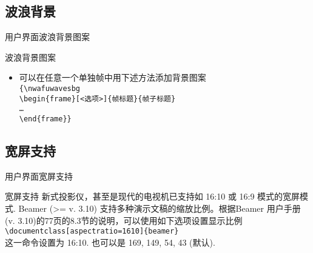 \subsection{波浪背景}
\begin{frame}{用户界面}{波浪背景图案}
  \begin{block}{波浪背景图案}
    \begin{itemize}
    \item 可以在任意一个单独帧中用下述方法添加背景图案\\
      {\tt \{\textbackslash nwafuwavesbg\\
        \textbackslash begin\{frame\}[<选项>]\{帧标题\}\{帧子标题\}\\
        \ldots\\
        \textbackslash end\{frame\}\}}
    \end{itemize}
  \end{block}
\end{frame}

\subsection{宽屏支持}
\begin{frame}{用户界面}{宽屏支持}
  \begin{block}{宽屏支持}
    新式投影仪，甚至是现代的电视机已支持如 16:10 或 16:9 模式的宽屏模式.
    Beamer (>= v. 3.10) 支持多种演示文稿的缩放比例。根据Beamer 用户手册
    (v. 3.10)的77页的8.3节的说明，可以使用如下选项设置显示比例\\
    {\tt\textbackslash documentclass[aspectratio=1610]\{beamer\}}\\
    这一命令设置为 16:10. 也可以是 169, 149, 54, 43 (默认).
  \end{block}
\end{frame}



